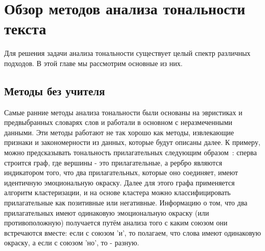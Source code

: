 \chapter{Обзор методов анализа тональности текста}

Для решения задачи анализа тональности существует целый спектр различных подходов. В этой главе мы рассмотрим основные из них.

\section{Методы без учителя}
Самые ранние методы анализа тональности были основаны на эвристиках и предвыбранных словарях слов и работали в основном с неразмеченными данными. Эти методы работают не так хорошо как методы, извлекающие признаки и закономерности из данных, которые будут описаны далее. К примеру, можно  предсказывать тональность прилагательных следующим образом~\cite{Hatzivassiloglou}: сперва строится граф, где вершины - это прилагательные, а рербро являются индикатором того, что два прилагательных, которые оно соединяет, имеют идентичную эмоциональную окраску. Далее для этого графа применяется алгоритм кластеризации, и на основе кластера можно классифицировать прилагательные как позитивные или негативные. Информацию о том, что два прилагательных имеют одинаковую эмоциональную окраску (или противоположную) получается путём анализа того с каким союзом они встречаются вместе: если с союзом 'и', то полагаем, что слова имеют одинаковую окраску, а если с союзом 'но', то - разную.

